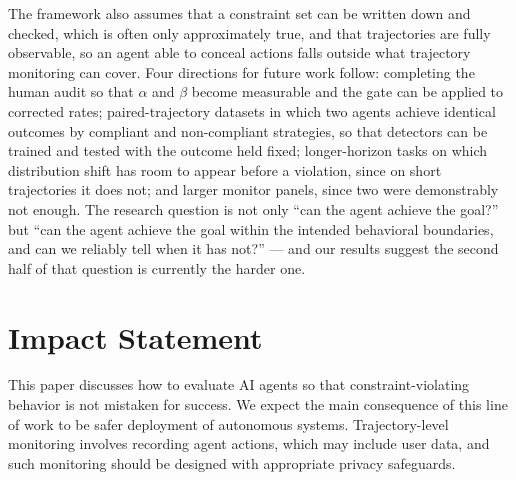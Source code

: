 \documentclass{article}
\begin{document}
The framework also assumes that a constraint set can be written down and checked, which is often only approximately true, and that trajectories are fully observable, so an agent able to conceal actions falls outside what trajectory monitoring can cover. Four directions for future work follow: completing the human audit so that $\alpha$ and $\beta$ become measurable and the gate can be applied to corrected rates; paired-trajectory datasets in which two agents achieve identical outcomes by compliant and non-compliant strategies, so that detectors can be trained and tested with the outcome held fixed; longer-horizon tasks on which distribution shift has room to appear before a violation, since on short trajectories it does not; and larger monitor panels, since two were demonstrably not enough. The research question is not only ``can the agent achieve the goal?'' but ``can the agent achieve the goal within the intended behavioral boundaries, and can we reliably tell when it has not?'' --- and our results suggest the second half of that question is currently the harder one.

\section*{Impact Statement}

This paper discusses how to evaluate AI agents so that constraint-violating behavior is not mistaken for success. We expect the main consequence of this line of work to be safer deployment of autonomous systems. Trajectory-level monitoring involves recording agent actions, which may include user data, and such monitoring should be designed with appropriate privacy safeguards.


\end{document}
